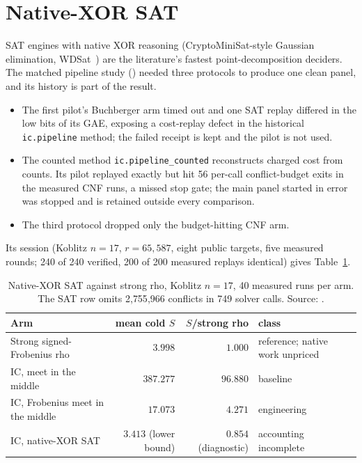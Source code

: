 \section{Native-XOR SAT}\label{sec:bo-sat}

SAT engines with native XOR reasoning (CryptoMiniSat-style Gaussian
elimination, WDSat~\cite{trimoska2020}) are the literature's fastest point-decomposition
deciders. The matched pipeline study ()
needed three protocols to produce one clean panel, and its history is part
of the result.
\begin{itemize}
\item The first pilot's Buchberger arm timed out and one SAT replay
  differed in the low bits of its GAE, exposing a cost-replay defect in
  the historical \texttt{ic.pipeline} method; the failed receipt is kept
  and the pilot is not used.
\item The counted method \texttt{ic.pipeline\_counted} reconstructs charged
  cost from counts. Its pilot replayed exactly but hit 56 per-call
  conflict-budget exits in the measured CNF runs, a missed stop gate; the
  main panel started in error was stopped and is retained outside every
  comparison.
\item The third protocol dropped only the budget-hitting CNF arm.
\end{itemize}
Its session (Koblitz $n=17$, $r=65{,}587$, eight public targets, five
measured rounds; 240 of 240 verified, 200 of 200 measured replays identical)
gives Table~\ref{tab:bo-sat}.

\begin{table}[t]
\centering\small
\begin{tabular}{@{}lrrl@{}}
\toprule
Arm & mean cold $S$ & $S$/strong rho & class \\
\midrule
Strong signed-Frobenius rho & $3.998$ & $1.000$ & reference; native work unpriced \\
IC, meet in the middle & $387.277$ & $96.880$ & baseline \\
IC, Frobenius meet in the middle & $17.073$ & $4.271$ & engineering \\
IC, native-XOR SAT & $3.413$ (lower bound) & $0.854$ (diagnostic) & accounting incomplete \\
\bottomrule
\end{tabular}
\caption[]{Native-XOR SAT against strong rho, Koblitz $n=17$, 40 measured
runs per arm. The SAT row omits 2{,}755{,}966 conflicts in 749 solver calls.
Source: .}
\label{tab:bo-sat}
\end{table}

